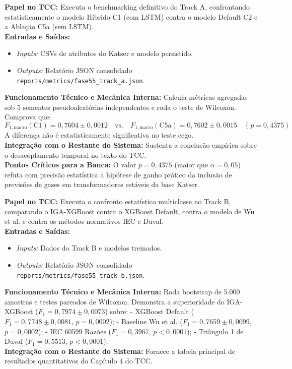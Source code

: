 \documentclass[10pt,a4paper]{article}
\begin{document}
\begin{filebox}
\textbf{Papel no TCC:} Executa o benchmarking definitivo do Track A, confrontando estatisticamente o modelo Híbrido C1 (com LSTM) contra o modelo Default C2 e a Ablação C5a (sem LSTM).\\
\textbf{Entradas e Saídas:}
\begin{itemize}[leftmargin=*,itemsep=1pt]
  \item \textit{Inputs:} CSVs de atributos do Katser e modelo persistido.
  \item \textit{Outputs:} Relatório JSON consolidado \texttt{reports/metrics/fase55\_track\_a.json}.
\end{itemize}
\textbf{Funcionamento Técnico e Mecânica Interna:} 
Calcula métricas agregadas sob 5 sementes pseudoaleatórias independentes e roda o teste de Wilcoxon. Comprova que:
$$F_{1,\text{macro}}(\text{C1}) = 0,7604 \pm 0,0012 \quad \text{vs.} \quad F_{1,\text{macro}}(\text{C5a}) = 0,7602 \pm 0,0015 \quad (p = 0,4375)$$
A diferença não é estatisticamente significativa no teste cego.\\
\textbf{Integração com o Restante do Sistema:} Sustenta a conclusão empírica sobre o desacoplamento temporal no texto do TCC.\\
\textbf{Pontos Críticos para a Banca:} O valor $p = 0,4375$ (maior que $\alpha = 0,05$) refuta com precisão estatística a hipótese de ganho prático da inclusão de previsões de gases em transformadores estáveis da base Katser.
\end{filebox}

\begin{filebox}
\textbf{Papel no TCC:} Executa o confronto estatístico multiclasse no Track B, comparando o IGA-XGBoost contra o XGBoost Default, contra o modelo de Wu et al. e contra os métodos normativos IEC e Duval.\\
\textbf{Entradas e Saídas:}
\begin{itemize}[leftmargin=*,itemsep=1pt]
  \item \textit{Inputs:} Dados do Track B e modelos treinados.
  \item \textit{Outputs:} Relatório JSON consolidado \texttt{reports/metrics/fase55\_track\_b.json}.
\end{itemize}
\textbf{Funcionamento Técnico e Mecânica Interna:} Roda bootstrap de 5.000 amostras e testes pareados de Wilcoxon. Demonstra a superioridade do IGA-XGBoost ($F_1 = 0,7974 \pm 0,0073$) sobre:
- XGBoost Default ($F_1 = 0,7748 \pm 0,0081$, $p = 0,0002$);
- Baseline Wu et al. ($F_1 = 0,7659 \pm 0,0099$, $p = 0,0002$);
- IEC 60599 Razões ($F_1 = 0,3967$, $p < 0,0001$);
- Triângulo 1 de Duval ($F_1 = 0,5513$, $p < 0,0001$).\\
\textbf{Integração com o Restante do Sistema:} Fornece a tabela principal de resultados quantitativos do Capítulo 4 do TCC.
\end{filebox}
\end{document}
